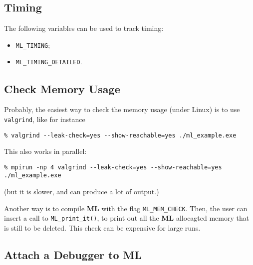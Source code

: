 \documentclass[10pt,letter,relax]{SANDreport}
\newcommand{\ML}     {{\bf ML }}
\begin{document}
\subsection{Timing}

The following variables can be used to track timing:
\begin{itemize}
\item \verb!ML_TIMING!;
\item \verb!ML_TIMING_DETAILED!.
\end{itemize}

\subsection{Check Memory Usage}

Probably, the easiest way to check the memory usage (under Linux) is to use
\verb!valgrind!, like for instance
\begin{verbatim}
% valgrind --leak-check=yes --show-reachable=yes ./ml_example.exe
\end{verbatim}
This also works in parallel:
\begin{verbatim}
% mpirun -np 4 valgrind --leak-check=yes --show-reachable=yes ./ml_example.exe
\end{verbatim}
(but it is slower, and can produce a lot of output.)

Another way is to compile \ML with the flag \verb!ML_MEM_CHECK!. Then,
the user can insert a call to \verb!ML_print_it()!, to print out all the
\ML allocagted memory that is still to be deleted. This check can be
expensive for large runs.

\subsection{Attach a Debugger to ML}
\end{document}
